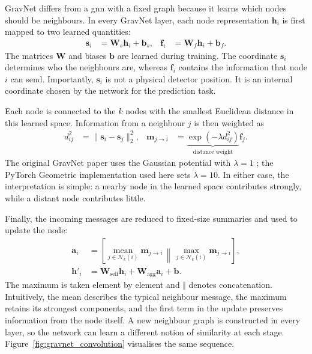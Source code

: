 GravNet differs from a \gls{gnn} with a fixed graph because it learns which nodes
should be neighbours. In every GravNet layer, each node representation
\(\mathbf{h}_i\) is first mapped to two learned quantities:
\begin{align}
    \mathbf{s}_i &= \mathbf{W}_s\mathbf{h}_i+\mathbf{b}_s,
    &
    \mathbf{f}_i &= \mathbf{W}_f\mathbf{h}_i+\mathbf{b}_f.
    \label{eq:gravnet_projections}
\end{align}
The matrices \(\mathbf{W}\) and biases \(\mathbf{b}\) are learned during
training. The coordinate \(\mathbf{s}_i\) determines who the neighbours are,
whereas \(\mathbf{f}_i\) contains the information that node \(i\) can send.
Importantly, \(\mathbf{s}_i\) is not a physical detector position. It is an
internal coordinate chosen by the network for the prediction task.

Each node is connected to the \(k\) nodes with the smallest Euclidean distance
in this learned space. Information from a neighbour \(j\) is then weighted as
\begin{align}
    d_{ij}^{2}
    &= \lVert\mathbf{s}_i-\mathbf{s}_j\rVert_2^2,
    &
    \mathbf{m}_{j\rightarrow i}
    &= \underbrace{\exp(-\lambda d_{ij}^{2})}_{\text{distance weight}}
       \mathbf{f}_j.
    \label{eq:gravnet_message}
\end{align}
The original GravNet paper uses the Gaussian potential with \(\lambda=1\)
\cite{qasim2019-gravnet}; the PyTorch Geometric implementation
\cite{fey2019-pytorch-geometric} used here sets \(\lambda=10\). In either case,
the interpretation is simple: a nearby node in the learned space contributes
strongly, while a distant node contributes little.

Finally, the incoming messages are reduced to fixed-size summaries and used to
update the node:
\begin{align}
    \mathbf{a}_i
    &=
    \left[
        \underset{j\in\mathcal{N}_k(i)}{\operatorname{mean}}
        \mathbf{m}_{j\rightarrow i}
        \,\middle\Vert\,
        \underset{j\in\mathcal{N}_k(i)}{\operatorname{max}}
        \mathbf{m}_{j\rightarrow i}
    \right],
    \label{eq:gravnet_aggregation}\\
    \mathbf{h}'_i
    &=
    \mathbf{W}_{\mathrm{self}}\mathbf{h}_i
    +
    \mathbf{W}_{\mathrm{agg}}\mathbf{a}_i
    +\mathbf{b}.
    \label{eq:gravnet_update}
\end{align}
The maximum is taken element by element and \(\Vert\) denotes concatenation.
Intuitively, the mean describes the typical neighbour message, the maximum
retains its strongest components, and the first term in the update preserves
information from the node itself. A new neighbour graph is constructed in
every layer, so the network can learn a different notion of similarity at
each stage. Figure~\ref{fig:gravnet_convolution} visualises the same sequence.

